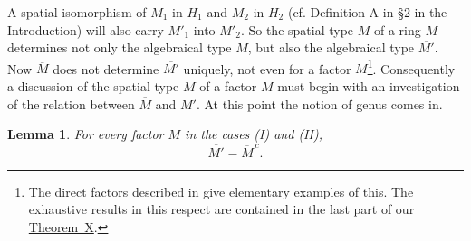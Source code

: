 \documentclass[b5paper,twoside]{article}
\newcommand{\thmref}[2]{\hyperref[#1]{\mbox{Theorem~#2}}}
\theoremstyle{mvnplain}
\newtheorem{lemma}{Lemma}[section]
\newcommand{\M}{\mathbf M}
\newcommand{\Hilbert}{\mathfrak H}
\def\M{M}%
\def\Hilbert{H}%
\def\widetilde#1{#1}%
\def\mathfrak#1{#1}%
\begin{document}
A spatial isomorphism of \(\M_1\) in \(\Hilbert_1\) and \(\M_2\) in
\(\Hilbert_2\) (cf. Definition A in \S2 in the Introduction) will also carry
\(\M'_1\) into \(\M'_2\). So the spatial type \(\widetilde{\M}\) of a ring
\(\M\) determines not only the algebraical type \(\overline{\M}\), but also
the algebraical type \(\overline{\M'}\). Now \(\overline{\M}\) does not
determine \(\overline{\M'}\) uniquely, not even for a factor
\(\M\)\footnote{The direct factors described in \cite[p.~139, or p.~173,
Lemma~8.6.1]{ref5} give elementary examples of this. The exhaustive results
in this respect are contained in the last part of our \thmref{thm:X}{X}.}.
Consequently a discussion of the spatial type \(\widetilde{\M}\) of a factor
\(\M\) must begin with an investigation of the relation between
\(\overline{\M}\) and \(\overline{\M'}\). At this point the notion of genus
comes in.

\begin{lemma}\label{lem:3.3.1}
For every factor \(\M\) in the cases (I) and (II),
\[
  \overline{\M'}=\overline{\M}^{\,c}.
\]
\end{lemma}
\end{document}

